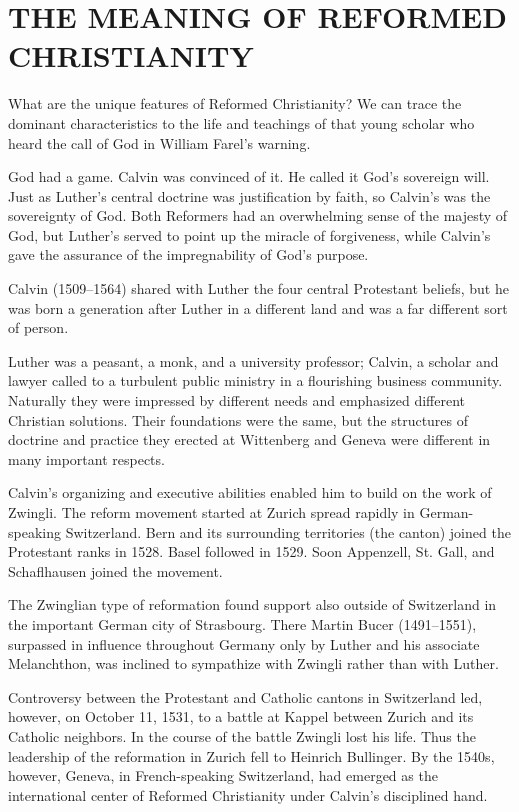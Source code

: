 \section{THE MEANING OF REFORMED CHRISTIANITY}

What are the unique features of Reformed Christianity? We can trace the dominant characteristics to
the life and teachings of that young scholar who heard the call of God in William Farel’s warning.

God had a game. Calvin was convinced of it. He called it God’s sovereign will. Just as Luther’s
central doctrine was justification by faith, so Calvin’s was the sovereignty of God. Both Reformers
had an overwhelming sense of the majesty of God, but Luther’s served to point up the miracle of
forgiveness, while Calvin’s gave the assurance of the impregnability of God’s purpose.

Calvin (1509–1564) shared with Luther the four central Protestant beliefs, but he was born a
generation after Luther in a different land and was a far different sort of person.

Luther was a peasant, a monk, and a university professor; Calvin, a scholar and lawyer called to a
turbulent public ministry in a flourishing business community. Naturally they were impressed by
different needs and emphasized different Christian solutions. Their foundations were the same, but
the structures of doctrine and practice they erected at Wittenberg and Geneva were different in many
important respects.

Calvin’s organizing and executive abilities enabled him to build on the work of Zwingli. The reform
movement started at Zurich spread rapidly in German-speaking Switzerland. Bern and its surrounding
territories (the canton) joined the Protestant ranks in 1528. Basel followed in 1529. Soon
Appenzell, St. Gall, and Schaflhausen joined the movement.

The Zwinglian type of reformation found support also outside of Switzerland in the important German
city of Strasbourg. There Martin Bucer (1491–1551), surpassed in influence throughout Germany only
by Luther and his associate Melanchthon, was inclined to sympathize with Zwingli rather than with
Luther.

Controversy between the Protestant and Catholic cantons in Switzerland led, however, on October 11,
1531, to a battle at Kappel between Zurich and its Catholic neighbors. In the course of the battle
Zwingli lost his life. Thus the leadership of the reformation in Zurich fell to Heinrich Bullinger.
By the 1540s, however, Geneva, in French-speaking Switzerland, had emerged as the international
center of Reformed Christianity under Calvin’s disciplined hand.

